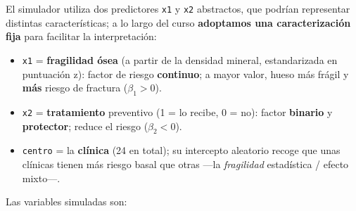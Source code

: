 \documentclass[
  letterpaper,
  DIV=11,
  numbers=noendperiod]{scrartcl}
\providecommand{\tightlist}{%
  \setlength{\itemsep}{0pt}\setlength{\parskip}{0pt}}\usepackage{longtable,booktabs,array}
\begin{document}
El simulador utiliza dos predictores \texttt{x1} y \texttt{x2}
abstractos, que podrían representar distintas características; a lo
largo del curso \textbf{adoptamos una caracterización fija} para
facilitar la interpretación:

\begin{itemize}
\tightlist
\item
  \texttt{x1} = \textbf{fragilidad ósea} (a partir de la densidad
  mineral, estandarizada en puntuación z): factor de riesgo
  \textbf{continuo}; a mayor valor, hueso más frágil y \textbf{más}
  riesgo de fractura (\(\beta_1>0\)).
\item
  \texttt{x2} = \textbf{tratamiento} preventivo (1 = lo recibe, 0 = no):
  factor \textbf{binario} y \textbf{protector}; reduce el riesgo
  (\(\beta_2<0\)).
\item
  \texttt{centro} = la \textbf{clínica} (24 en total); su intercepto
  aleatorio recoge que unas clínicas tienen más riesgo basal que otras
  ---la \emph{fragilidad} estadística / efecto mixto---.
\end{itemize}

Las variables simuladas son:
\end{document}

